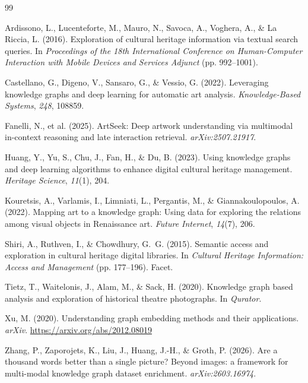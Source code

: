 \documentclass[12pt, a4paper]{article}
\begin{document}
\newpage

\begin{thebibliography}{99}

Ardissono, L., Lucenteforte, M., Mauro, N., Savoca, A., Voghera, A., \& La Riccia, L. (2016).
Exploration of cultural heritage information via textual search queries. In
\textit{Proceedings of the 18th International Conference on Human-Computer Interaction with
Mobile Devices and Services Adjunct} (pp. 992--1001).

Castellano, G., Digeno, V., Sansaro, G., \& Vessio, G. (2022). Leveraging knowledge graphs and
deep learning for automatic art analysis. \textit{Knowledge-Based Systems}, \textit{248}, 108859.

Fanelli, N., et al. (2025). ArtSeek: Deep artwork understanding via multimodal in-context
reasoning and late interaction retrieval. \textit{arXiv:2507.21917}.

Huang, Y., Yu, S., Chu, J., Fan, H., \& Du, B. (2023). Using knowledge graphs and deep learning
algorithms to enhance digital cultural heritage management. \textit{Heritage Science},
\textit{11}(1), 204.

Kouretsis, A., Varlamis, I., Limniati, L., Pergantis, M., \& Giannakoulopoulos, A. (2022).
Mapping art to a knowledge graph: Using data for exploring the relations among visual objects
in Renaissance art. \textit{Future Internet}, \textit{14}(7), 206.

Shiri, A., Ruthven, I., \& Chowdhury, G.~G. (2015). Semantic access and exploration in cultural
heritage digital libraries. In \textit{Cultural Heritage Information: Access and Management}
(pp. 177--196). Facet.

Tietz, T., Waitelonis, J., Alam, M., \& Sack, H. (2020). Knowledge graph based analysis and
exploration of historical theatre photographs. In \textit{Qurator}.

Xu, M. (2020). Understanding graph embedding methods and their applications.
\textit{arXiv}. \url{https://arxiv.org/abs/2012.08019}

Zhang, P., Zaporojets, K., Liu, J., Huang, J.-H., \& Groth, P. (2026). Are a thousand words
better than a single picture? Beyond images: a framework for multi-modal knowledge graph
dataset enrichment. \textit{arXiv:2603.16974}.

\end{thebibliography}
\end{document}
